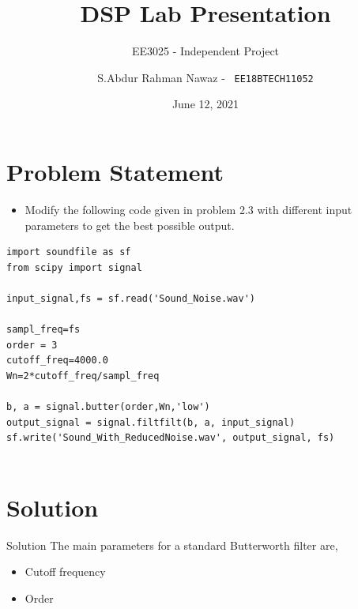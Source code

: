 \documentclass{beamer}
\title{DSP Lab Presentation}
\subtitle{EE3025 - Independent Project}
\author{
S.Abdur Rahman Nawaz -  \
\texttt{EE18BTECH11052}
}
\institute{IIT HYDERABAD}
\date{June 12, 2021}
\begin{document}
\begin{frame}
  \titlepage
\end{frame}
\section{Problem Statement}

\begin{frame}[fragile]
\begin{itemize}
    \item{ Modify the following code given in problem 2.3 with different input parameters to get the best possible output.}
\end{itemize}
\begin{verbatim}
import soundfile as sf
from scipy import signal
    
input_signal,fs = sf.read('Sound_Noise.wav')

sampl_freq=fs
order = 3
cutoff_freq=4000.0
Wn=2*cutoff_freq/sampl_freq

b, a = signal.butter(order,Wn,'low')
output_signal = signal.filtfilt(b, a, input_signal)
sf.write('Sound_With_ReducedNoise.wav', output_signal, fs)
    
\end{verbatim}
\end{frame}

\section{Solution}

\begin{frame}{Solution}
  The main parameters for a standard Butterworth filter are, 
  \begin{itemize}
  \item{Cutoff frequency}
  \item{Order}
  \end{itemize}
\end{frame}
\end{document}
